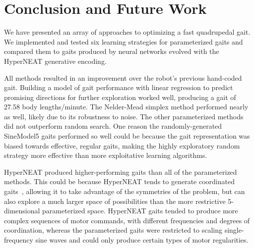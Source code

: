 \section{Conclusion and Future Work}

We have presented an array of approaches to optimizing a fast quadrupedal
gait.  We implemented and tested six learning
strategies for parameterized gaits and compared them to gaits produced by neural networks
evolved with the HyperNEAT generative encoding.

All methods resulted in an improvement over the robot's previous
hand-coded gait.  Building a model of gait
performance with linear regression to predict promising directions for further exploration
worked well, producing a gait of 27.58 body
lengths/minute.  The Nelder-Mead simplex method performed nearly as well, likely due to its robustness to noise.  The other parameterized
methods did not outperform random search.  One reason the randomly-generated SineModel5 gaits performed so well could be because the gait representation was biased towards effective, regular gaits, making the highly exploratory random strategy more effective than more exploitative learning algorithms. 

HyperNEAT produced higher-performing gaits than all of the parameterized
methods.  This could be because HyperNEAT tends to generate coordinated gaits~\cite{clune2011performance, clune2009evolving}, allowing it to
take advantage of the symmetries of the problem, but can also explore a much larger space of possibilities than the
more restrictive 5-dimensional parameterized space.  HyperNEAT gaits tended to produce more complex sequences of motor commands, with different frequencies and degrees of coordination, whereas the
parameterized gaits were restricted to scaling single-frequency sine waves and could only produce certain types of motor regularities. 
